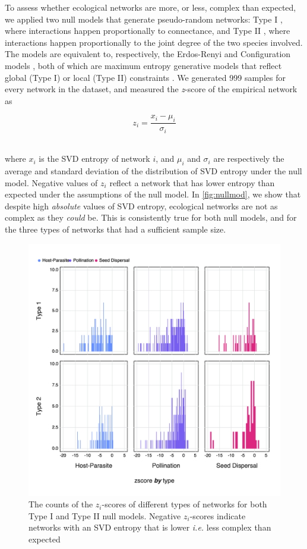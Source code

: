 To assess whether ecological networks are more, or less, complex than expected,
we applied two null models that generate pseudo-random networks: Type I
\cite{Fortuna2006HabLos}, where interactions happen proportionally to
connectance, and Type II \cite{Bascompte2003NesAss}, where interactions happen
proportionally to the joint degree of the two species involved. The models are
equivalent to, respectively, the Erdos-Renyi and Configuration models
\cite{Newman2010NetInt}, both of which are maximum entropy generative models
that reflect global (Type I) or local (Type II) constraints
\cite{Park2004StaMec}. We generated 999 samples for every network in the
dataset, and measured the \emph{z}-score of the empirical network as

\[z_i = \frac{x_i-\mu_i}{\sigma_i}\]\

where \(x_i\) is the SVD entropy of network \(i\), and \(\mu_i\) and
\(\sigma_i\) are respectively the average and standard deviation of the
distribution of SVD entropy under the null model. Negative values of \(z_i\)
reflect a network that has lower entropy than expected under the assumptions of
the null model. In \autoref{fig:nullmod}, we show that despite high
\emph{absolute} values of SVD entropy, ecological networks are not as complex as
they \emph{could} be. This is consistently true for both null models, and for
the three types of networks that had a sufficient sample size.

\begin{figure}[h]
    \centering
    \includegraphics[width=\textwidth]{figures/nullmodel_histogram.png}
    \caption{The counts of the \(z_i\)-scores of different types of networks for
both Type I and Type II null models. Negative \(z_i\)-scores indicate networks
with an SVD entropy that is lower \emph{i.e.} less complex than expected}
    \label{fig:nullmod}
\end{figure}

